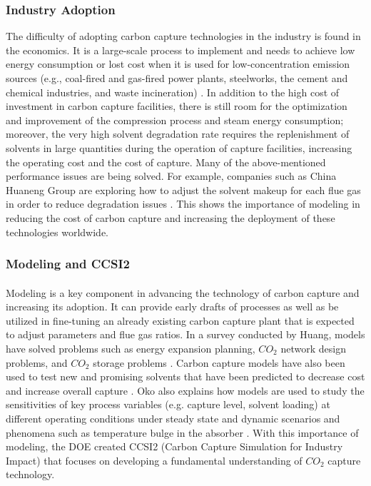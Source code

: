 \documentclass[12pt, letterpaper]{article}
\begin{document}
\subsubsection{Industry Adoption}
The difficulty of adopting carbon capture technologies in the industry is found in the economics. It is a large-scale process to implement and needs to achieve low energy consumption or lost cost when it is used for low-concentration emission sources (e.g., coal-fired and gas-fired power plants, steelworks, the cement and chemical industries, and waste incineration) \cite{Ma2022}. In addition to the high cost of investment in carbon capture facilities, there is still room for the optimization and improvement of the compression process and steam energy consumption; moreover, the very high solvent degradation rate requires the replenishment of solvents in large quantities during the operation of capture facilities, increasing the operating cost and the cost of capture.  Many of the above-mentioned performance issues are being solved.  For example, companies such as China Huaneng Group are exploring how to adjust the solvent makeup for each ﬂue gas in order to  reduce degradation issues \cite{Ma2022}.  This shows the importance of modeling in reducing the cost of carbon capture and increasing the deployment of these technologies worldwide. 

\subsubsection{Modeling and CCSI2}

\paragraph{}
Modeling is a key component in advancing the technology of carbon capture and increasing its adoption. It can provide early drafts of processes as well as be utilized in fine-tuning an already existing carbon capture plant that is expected to adjust parameters and flue gas ratios. In a survey conducted by Huang, models have solved problems such as energy expansion planning, $CO_2$ network design problems, and $CO_2$ storage problems \cite{Huang2013}. Carbon capture models have also been used to test new and promising solvents that have been predicted to decrease cost and increase overall capture \cite{Oko2017}. Oko also explains how models are used to study the sensitivities of key process variables (e.g. capture level, solvent loading) at different operating conditions under steady state and dynamic scenarios and phenomena such as temperature bulge in the absorber \cite{Kvamsdal2008}. With this importance of modeling, the DOE created CCSI2 (Carbon Capture Simulation for Industry Impact) that focuses on developing a fundamental understanding of $CO_2$ capture technology.
\end{document}
